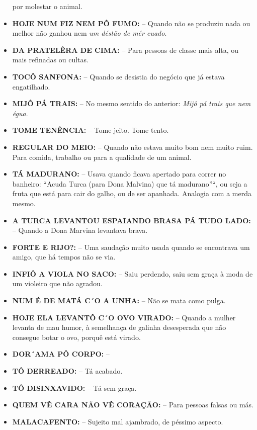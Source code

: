 \documentclass[12pt,brazil,]{book}
\begin{document}
\begin{itemize}
  por molestar o animal.\\
\item
  \textbf{HOJE NUM FIZ NEM PÔ FUMO:} -- Quando não se produziu nada ou
  melhor não ganhou nem \emph{um déstão de mér cuado}.\\
\item
  \textbf{DA PRATELÊRA DE CIMA:} -- Para pessoas de classe mais alta, ou
  mais refinadas ou cultas.\\
\item
  \textbf{TOCÔ SANFONA:} -- Quando se desistia do negócio que já estava
  engatilhado.\\
\item
  \textbf{MIJÔ PÁ TRAIS:} -- No mesmo sentido do anterior: \emph{Mijô pá
  trais que nem égua}.\\
\item
  \textbf{TOME TENÊNCIA:} -- Tome jeito. Tome tento.\\
\item
  \textbf{REGULAR DO MEIO:} -- Quando não estava muito bom nem muito
  ruim. Para comida, trabalho ou para a qualidade de um animal.\\
\item
  \textbf{TÁ MADURANO:} -- Usava quando ficava apertado para correr no
  banheiro: ``Acuda Turca (para Dona Malvina) que tá madurano''``, ou
  seja a fruta que está para cair do galho, ou de ser apanhada. Analogia
  com a merda mesmo.\\
\item
  \textbf{A TURCA LEVANTOU ESPAIANDO BRASA PÁ TUDO LADO:} -- Quando a
  Dona Marvina levantava brava.\\
\item
  \textbf{FORTE E RIJO?:} -- Uma saudação muito usada quando se
  encontrava um amigo, que há tempos não se via.\\
\item
  \textbf{INFIÔ A VIOLA NO SACO:} -- Saiu perdendo, saiu sem graça à
  moda de um violeiro que não agradou.\\
\item
  \textbf{NUM É DE MATÁ C´O A UNHA:} -- Não se mata como pulga.\\
\item
  \textbf{HOJE ELA LEVANTÔ C´O OVO VIRADO:} -- Quando a mulher levanta
  de mau humor, à semelhança de galinha desesperada que não consegue
  botar o ovo, porquê está virado.\\
\item
  \textbf{DOR´AMA PÔ CORPO:} --\\
\item
  \textbf{TÔ DERREADO:} -- Tá acabado.\\
\item
  \textbf{TÔ DISINXAVIDO:} -- Tá sem graça.\\
\item
  \textbf{QUEM VÊ CARA NÃO VÊ CORAÇÃO:} -- Para pessoas falsas ou más.
\item
  \textbf{MALACAFENTO:} -- Sujeito mal ajambrado, de péssimo aspecto.
\end{itemize}
\end{document}
